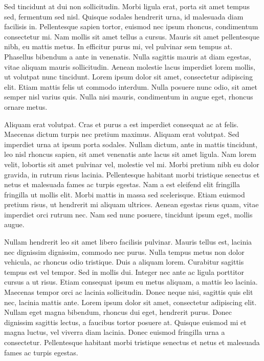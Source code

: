 \documentclass[]{article}
\begin{document}
Sed tincidunt at dui non sollicitudin. Morbi ligula erat, porta sit amet
tempus sed, fermentum sed nisl. Quisque sodales hendrerit urna, id
malesuada diam facilisis in. Pellentesque sapien tortor, euismod nec
ipsum rhoncus, condimentum consectetur mi. Nam mollis sit amet tellus a
cursus. Mauris sit amet pellentesque nibh, eu mattis metus. In efficitur
purus mi, vel pulvinar sem tempus at. Phasellus bibendum a ante in
venenatis. Nulla sagittis mauris at diam egestas, vitae aliquam mauris
sollicitudin. Aenean molestie lacus imperdiet lorem mollis, ut volutpat
nunc tincidunt. Lorem ipsum dolor sit amet, consectetur adipiscing elit.
Etiam mattis felis ut commodo interdum. Nulla posuere nunc odio, sit
amet semper nisl varius quis. Nulla nisi mauris, condimentum in augue
eget, rhoncus ornare metus.

Aliquam erat volutpat. Cras et purus a est imperdiet consequat ac at
felis. Maecenas dictum turpis nec pretium maximus. Aliquam erat
volutpat. Sed imperdiet urna at ipsum porta sodales. Nullam dictum, ante
in mattis tincidunt, leo nisl rhoncus sapien, sit amet venenatis ante
lacus sit amet ligula. Nam lorem velit, lobortis sit amet pulvinar vel,
molestie vel mi. Morbi pretium nibh eu dolor gravida, in rutrum risus
lacinia. Pellentesque habitant morbi tristique senectus et netus et
malesuada fames ac turpis egestas. Nam a est eleifend elit fringilla
fringilla ut mollis elit. Morbi mattis in massa sed scelerisque. Etiam
euismod pretium risus, ut hendrerit mi aliquam ultrices. Aenean egestas
risus quam, vitae imperdiet orci rutrum nec. Nam sed nunc posuere,
tincidunt ipsum eget, mollis augue.

Nullam hendrerit leo sit amet libero facilisis pulvinar. Mauris tellus
est, lacinia nec dignissim dignissim, commodo nec purus. Nulla tempus
metus non dolor vehicula, ac rhoncus odio tristique. Duis a aliquam
lorem. Curabitur sagittis tempus est vel tempor. Sed in mollis dui.
Integer nec ante ac ligula porttitor cursus a ut risus. Etiam consequat
ipsum eu metus aliquam, a mattis leo lacinia. Maecenas tempor orci ac
lacinia sollicitudin. Donec neque nisi, sagittis quis elit nec, lacinia
mattis ante. Lorem ipsum dolor sit amet, consectetur adipiscing elit.
Nullam eget magna bibendum, rhoncus dui eget, hendrerit purus. Donec
dignissim sagittis lectus, a faucibus tortor posuere at. Quisque euismod
mi et magna luctus, vel viverra diam lacinia. Donec euismod fringilla
urna a consectetur. Pellentesque habitant morbi tristique senectus et
netus et malesuada fames ac turpis egestas.
\end{document}
